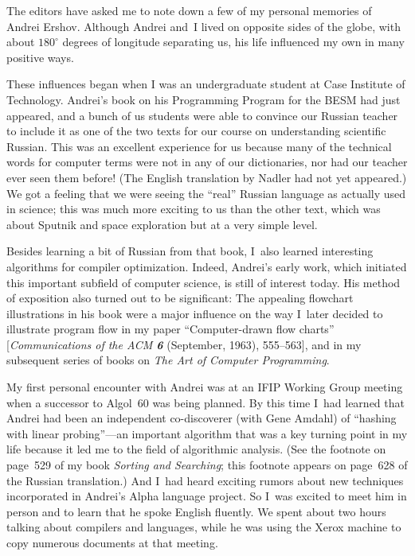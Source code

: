 
\magnification{}

\medskip
The editors have asked me to note down a few of my personal memories of
Andrei Ershov. Although Andrei and~I lived on opposite sides of the globe,
with about $180^{\circ}$ degrees of longitude separating us, his life
influenced my own in many positive ways.

These influences began when I was an undergraduate student at Case Institute
of Technology. Andrei's book on his Programming Program for the BESM had just
appeared, and a bunch of us students were able to convince our Russian teacher
to include it as one of the two texts for our course on understanding
scientific Russian. This was an excellent experience for us because many of the
technical words for computer terms were not in any of our dictionaries,
nor had our teacher ever seen them before! (The English translation by
Nadler had not yet appeared.) We got a feeling that we were seeing the ``real''
Russian language as actually used in science; this was much more exciting to us
than the other text, which was about Sputnik and space exploration but at
a very simple level.

Besides learning a bit of Russian from that book, I~also learned interesting
algorithms for compiler optimization. Indeed, Andrei's early work, which
initiated this important subfield of computer science, is still of interest
today. His method of exposition also turned out to be significant:
The appealing flowchart illustrations in his book were a major influence on
the way I~later decided to illustrate program flow in my paper
``Computer-drawn flow charts'' [{\sl Communications of the ACM\/ \bf 6}
(September, 1963), 555--563], and in my subsequent series
of books on {\sl The Art of Computer Programming}.

My first personal encounter with Andrei was at an IFIP Working Group meeting
when a successor to Algol~60 was being planned. By this time I~had learned
that Andrei had been an independent co-discoverer (with Gene Amdahl)
of ``hashing with linear probing''---an important algorithm that was a
key turning point in my life because it led me to the field of algorithmic
analysis. (See the footnote on page~529 of my book {\sl Sorting and Searching\/};
this  footnote
appears on page~628 of the Russian translation.) And I~had heard
exciting rumors about new techniques incorporated in Andrei's Alpha
language project. So I~was excited to meet him in person and to learn that
he spoke English fluently. We spent about two hours talking about compilers
and languages, while he was using the Xerox machine to copy numerous
documents at that meeting.

